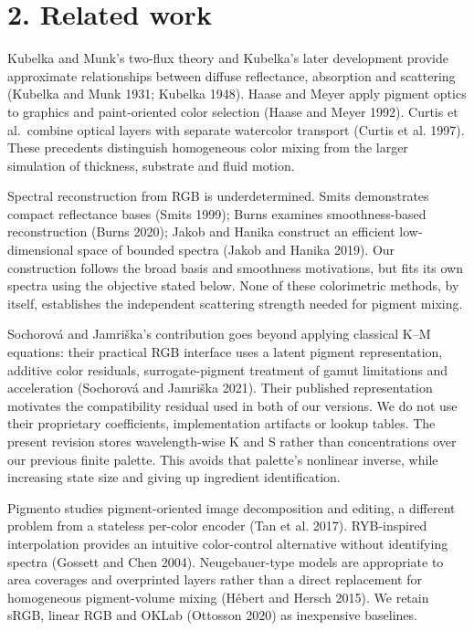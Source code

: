 \documentclass[
  10pt,
  twocolumn]{article}
\begin{document}
\hypertarget{related-work}{%
\section{2. Related work}\label{related-work}}

Kubelka and Munk's two-flux theory and Kubelka's later development
provide approximate relationships between diffuse reflectance,
absorption and scattering (Kubelka and Munk 1931; Kubelka 1948). Haase
and Meyer apply pigment optics to graphics and paint-oriented color
selection (Haase and Meyer 1992). Curtis et al.~combine optical layers
with separate watercolor transport (Curtis et al. 1997). These
precedents distinguish homogeneous color mixing from the larger
simulation of thickness, substrate and fluid motion.

Spectral reconstruction from RGB is underdetermined. Smits demonstrates
compact reflectance bases (Smits 1999); Burns examines smoothness-based
reconstruction (Burns 2020); Jakob and Hanika construct an efficient
low-dimensional space of bounded spectra (Jakob and Hanika 2019). Our
construction follows the broad basis and smoothness motivations, but
fits its own spectra using the objective stated below. None of these
colorimetric methods, by itself, establishes the independent scattering
strength needed for pigment mixing.

Sochorová and Jamriška's contribution goes beyond applying classical
K--M equations: their practical RGB interface uses a latent pigment
representation, additive color residuals, surrogate-pigment treatment of
gamut limitations and acceleration (Sochorová and Jamriška 2021). Their
published representation motivates the compatibility residual used in
both of our versions. We do not use their proprietary coefficients,
implementation artifacts or lookup tables. The present revision stores
wavelength-wise K and S rather than concentrations over our previous
finite palette. This avoids that palette's nonlinear inverse, while
increasing state size and giving up ingredient identification.

Pigmento studies pigment-oriented image decomposition and editing, a
different problem from a stateless per-color encoder (Tan et al. 2017).
RYB-inspired interpolation provides an intuitive color-control
alternative without identifying spectra (Gossett and Chen 2004).
Neugebauer-type models are appropriate to area coverages and overprinted
layers rather than a direct replacement for homogeneous pigment-volume
mixing (Hébert and Hersch 2015). We retain sRGB, linear RGB and OKLab
(Ottosson 2020) as inexpensive baselines.
\end{document}
